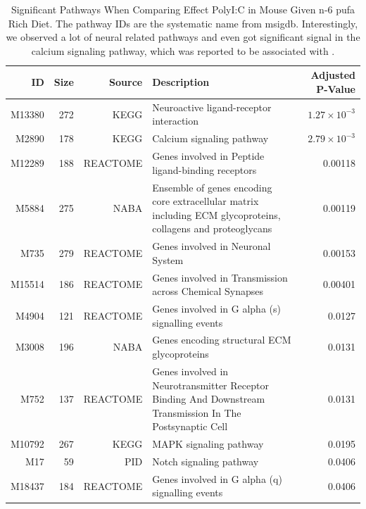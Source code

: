 \documentclass[12pt]{scrbook}
\newcommand*{\glng}{\glsentrylong}
\begin{document}
\begin{landscape}
	\begin{table}
		\begin{tabular}{rrrp{10cm}r}
			\toprule
			ID&	Size&	Source&	Description&	Adjusted P-Value\\
			\midrule
			M13380&	272&	KEGG&	Neuroactive ligand-receptor interaction&	$1.27\times10^{-3}$\\
			M2890&	178&	KEGG&	Calcium signaling pathway&	$2.79\times10^{-3}$\\
			M12289&	188&	REACTOME&	Genes involved in Peptide ligand-binding receptors&	0.00118\\
			M5884&	275&	NABA&	Ensemble of genes encoding core extracellular matrix including ECM glycoproteins, collagens and proteoglycans&	0.00119\\
			M735&	279&	REACTOME&	Genes involved in Neuronal System&	0.00153\\
			M15514&	186&	REACTOME&	Genes involved in Transmission across Chemical Synapses&	0.00401\\
			M4904&	121&	REACTOME&	Genes involved in G alpha (s) signalling events&	0.0127\\
			M3008&	196&	NABA&	Genes encoding structural ECM glycoproteins&	0.0131\\
			M752&	137&	REACTOME&	Genes involved in Neurotransmitter Receptor Binding And Downstream Transmission In The Postsynaptic Cell&	0.0131\\
			M10792&	267&	KEGG&	MAPK signaling pathway&	0.0195\\
			M17&	59&	PID&	Notch signaling pathway&	0.0406\\
			M18437&	184&	REACTOME&	Genes involved in G alpha (q) signalling events&	0.0406\\
			\bottomrule
		\end{tabular}
		\caption[Significant Pathways When Comparing Effect PolyI:C in Mouse Given n-6 \gls{pufa} Rich Diet]{Significant Pathways When Comparing Effect PolyI:C in Mouse Given n-6 \gls{pufa} Rich Diet.
			The pathway IDs are the systematic name from \gls{msigdb}.
			Interestingly, we observed a lot of neural related pathways and even got significant signal in the calcium signaling pathway, which was reported to be associated with \glng{scz} \citep{Purcell2014}. 
		}
		\label{tab:miaPath}
	\end{table}
	

\end{landscape}
\end{document}
